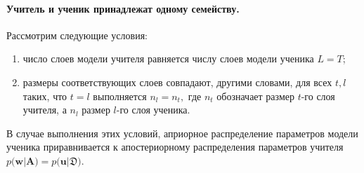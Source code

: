 \paragraph{Учитель и ученик принадлежат одному семейству.}
\label{section:one:space}
Рассмотрим следующие условия:
\begin{enumerate}
    \item число слоев модели учителя равняется числу слоев модели ученика $L=T$;
    \item размеры соответствующих слоев совпадают, другими словами, для всех $t, l$ таких, что $t=l$ выполняется $n_l = n_t,$ где $n_t$ обозначает размер $t$-го слоя учителя, а $n_l$ размер $l$-го слоя ученика.
\end{enumerate}
В случае выполнения этих условий, априорное распределение параметров модели ученика приравнивается к апостериорному распределения параметров учителя $p\bigr(\mathbf{w}|\mathbf{A}\bigr) = p\bigr(\mathbf{u}|\mathfrak{D}\bigr)$.

